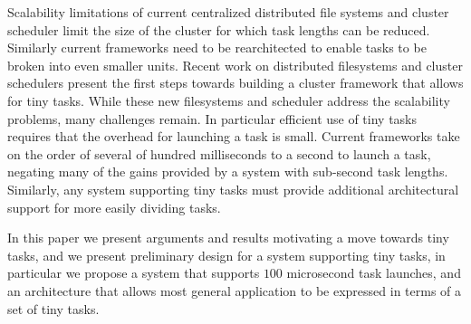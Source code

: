 Scalability limitations of current centralized distributed file systems and cluster
scheduler limit the size of the cluster for which task lengths can be reduced. Similarly
current frameworks need to be rearchitected to enable tasks to be broken into even smaller
units. 
Recent work on distributed filesystems\cite{nightingale2012flat} and cluster
schedulers\cite{ousterhoutbatch} present the first steps towards
building a cluster framework that allows for tiny tasks. While these new filesystems
and scheduler address the scalability problems, many challenges remain. In particular
efficient use of tiny tasks requires that the overhead for launching a task is small. Current
frameworks take on the order of several of hundred milliseconds to a second to launch a task, negating
many of the gains provided by a system with sub-second task lengths. Similarly, any system
supporting tiny tasks must provide additional architectural support for more easily dividing tasks.

In this paper we present arguments and results motivating a move towards tiny tasks,
and we present preliminary design for a system supporting tiny tasks, in particular
we propose a system that supports $100$ microsecond task launches, and an architecture
that allows most general application to be expressed in terms of a set of tiny tasks.

